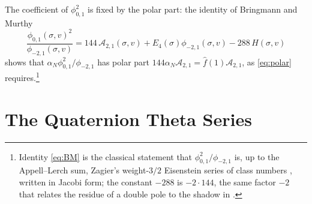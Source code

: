 \documentclass[mathematics,article,submit,pdftex,oneauthor]{Definitions/mdpi}
\numberwithin{equation}{section}
\theoremstyle{plain}
\theoremstyle{remark}
\newcommand{\cA}{\mathcal{A}}
\newcommand{\pmi}{\phi_{-2,1}}
\newcommand{\pz}{\phi_{0,1}}
\begin{document}
The coefficient of $\pz^2$ is fixed by the polar part: the identity of Bringmann and Murthy \cite[Section~3]{BM13}
\begin{equation}\label{eq:BM}
\frac{\pz(\sigma,v)^2}{\pmi(\sigma,v)}=144\,\cA_{2,1}(\sigma,v)+E_4(\sigma)\pmi(\sigma,v)-288\,H(\sigma,v)
\end{equation}
shows that $\alpha_N\pz^2/\pmi$ has polar part $144\alpha_N\cA_{2,1}=\hat f(1)\cA_{2,1}$, as \eqref{eq:polar} requires.\footnote{Identity \eqref{eq:BM} is the classical statement that $\pz^2/\pmi$ is, up to the Appell--Lerch sum, Zagier's weight-$3/2$ Eisenstein series of class numbers \cite{Zag75}, written in Jacobi form; the constant $-288$ is $-2\cdot144$, the same factor $-2$ that relates the residue of a double pole to the shadow in \cite{DMZ12}.}

\section{The Quaternion Theta Series}\label{sec:theta}
\end{document}
